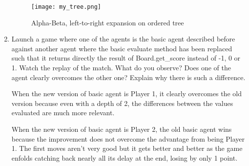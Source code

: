 \begin{enumerate}
\begin{figure}[!ht]
\begin{framed}
        \bigskip
        \bigskip
	  \centering
	  \texttt{[image: my\_tree.png]}
      \bigskip
      \bigskip
	  \caption{Alpha-Beta, left-to-right expansion on ordered tree}
      \end{framed}
      \end{figure}
      \FloatBarrier
    \item Launch a game where one of the agents is the basic agent described before against another agent where the basic evaluate method has been replaced such that it returns directly the result of Board.get\_score instead of -1, 0 or 1. Watch the replay of the match. What do you observe? Does one of the agent clearly overcomes the other one? Explain why there is such a difference.
      \begin{framed}
          When the new version of basic agent is Player 1, it clearly
          overcomes the old version because even with a depth of 2, the
          differences between the values evaluated are  much more relevant.
          \newline

          When the new version of basic agent is Player 2, the old basic
          agent wins because the improvement does not overcome the advantage
          from being Player 1. The first moves aren't very good but it gets
          better and better as the game enfolds catching back nearly all
          its delay at the end, losing by only 1 point. \newline
      \end{framed}
\end{enumerate}
